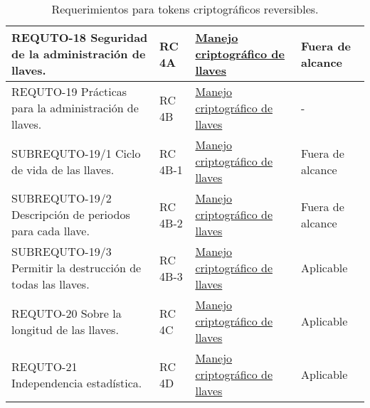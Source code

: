 \begin{table}[H]
\begin{tabular}{| p{5.5cm} | p{2cm} | p{4cm} | p{4cm} |}
    REQUTO-18 Seguridad de la administración de llaves.  
    &  RC 4A    &  \hyperref[dm:man_llaves]{Manejo criptográfico de llaves}    &  Fuera de alcance \\ \hline
    REQUTO-19 Prácticas para la administración de llaves.  
    &  RC 4B    &  \hyperref[dm:man_llaves]{Manejo criptográfico de llaves}    &  -                \\ \hline
    SUBREQUTO-19/1 Ciclo de vida de las llaves.  
    &  RC 4B-1  &  \hyperref[dm:man_llaves]{Manejo criptográfico de llaves}    &  Fuera de alcance \\ \hline
    SUBREQUTO-19/2 Descripción de periodos para cada llave.  
    &  RC 4B-2  &  \hyperref[dm:man_llaves]{Manejo criptográfico de llaves}    &  Fuera de alcance \\ \hline
    SUBREQUTO-19/3 Permitir la destrucción de todas las llaves.  
    &  RC 4B-3  &  \hyperref[dm:man_llaves]{Manejo criptográfico de llaves}    &  Aplicable        \\ \hline
    REQUTO-20 Sobre la longitud de las llaves.  
    &  RC 4C    &  \hyperref[dm:man_llaves]{Manejo criptográfico de llaves}    &  Aplicable        \\ \hline
    REQUTO-21 Independencia estadística.  
    &  RC 4D    &  \hyperref[dm:man_llaves]{Manejo criptográfico de llaves}    &  Aplicable        \\ \hline

  \end{tabular}
  \caption{Requerimientos para tokens criptográficos reversibles.}
\end{table}

